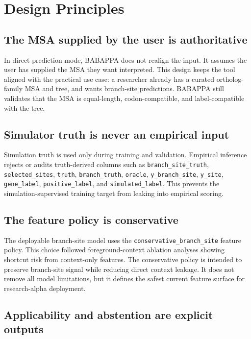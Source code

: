 \documentclass[11pt,a4paper]{article}
\begin{document}
\section{Design Principles}

\subsection{The MSA supplied by the user is authoritative}

In direct prediction mode, BABAPPA does not realign the input. It assumes the user has supplied the MSA they want interpreted. This design keeps the tool aligned with the practical use case: a researcher already has a curated ortholog-family MSA and tree, and wants branch-site predictions. BABAPPA still validates that the MSA is equal-length, codon-compatible, and label-compatible with the tree.

\subsection{Simulator truth is never an empirical input}

Simulation truth is used only during training and validation. Empirical inference rejects or audits truth-derived columns such as \texttt{branch\_site\_truth}, \texttt{selected\_sites}, \texttt{truth}, \texttt{branch\_truth}, \texttt{oracle}, \texttt{y\_branch\_site}, \texttt{y\_site}, \texttt{gene\_label}, \texttt{positive\_label}, and \texttt{simulated\_label}. This prevents the simulation-supervised training target from leaking into empirical scoring.

\subsection{The feature policy is conservative}

The deployable branch-site model uses the \texttt{conservative\_branch\_site} feature policy. This choice followed foreground-context ablation analyses showing shortcut risk from context-only features. The conservative policy is intended to preserve branch-site signal while reducing direct context leakage. It does not remove all model limitations, but it defines the safest current feature surface for research-alpha deployment.

\subsection{Applicability and abstention are explicit outputs}
\end{document}
